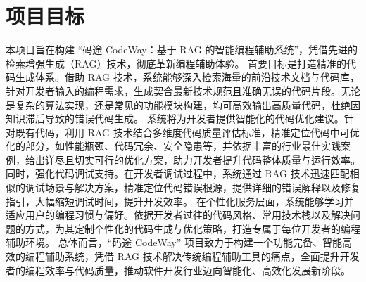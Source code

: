 \documentclass[
    report,     %
    oneside,    %
    UTF8,       %
    zihao=-4    %
]{config} %
\begin{document}
\section{项目目标}
本项目旨在构建 “码途 CodeWay：基于 RAG 的智能编程辅助系统”，凭借先进的检索增强生成（RAG）技术，彻底革新编程辅助体验。
首要目标是打造精准的代码生成体系。借助 RAG 技术，系统能够深入检索海量的前沿技术文档与代码库，针对开发者输入的编程需求，生成契合最新技术规范且准确无误的代码片段。无论是复杂的算法实现，还是常见的功能模块构建，均可高效输出高质量代码，杜绝因知识滞后导致的错误代码生成。
系统将为开发者提供智能化的代码优化建议。针对既有代码，利用 RAG 技术结合多维度代码质量评估标准，精准定位代码中可优化的部分，如性能瓶颈、代码冗余、安全隐患等，并依据丰富的行业最佳实践案例，给出详尽且切实可行的优化方案，助力开发者提升代码整体质量与运行效率。
同时，强化代码调试支持。在开发者调试过程中，系统通过 RAG 技术迅速匹配相似的调试场景与解决方案，精准定位代码错误根源，提供详细的错误解释以及修复指引，大幅缩短调试时间，提升开发效率。
在个性化服务层面，系统能够学习并适应用户的编程习惯与偏好。依据开发者过往的代码风格、常用技术栈以及解决问题的方式，为其定制个性化的代码生成与优化策略，打造专属于每位开发者的编程辅助环境。
总体而言，“码途 CodeWay” 项目致力于构建一个功能完备、智能高效的编程辅助系统，凭借 RAG 技术解决传统编程辅助工具的痛点，全面提升开发者的编程效率与代码质量，推动软件开发行业迈向智能化、高效化发展新阶段。

\end{document}
